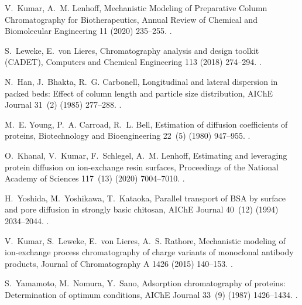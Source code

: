 \documentclass[preprint,review,12pt]{elsarticle}
\providecommand{\DIFaddtex}[1]{{\protect\color{blue} \sf #1}} %
\providecommand{\DIFaddbegin}{} %
\providecommand{\DIFaddend}{} %
\providecommand{\DIFadd}[1]{\texorpdfstring{\DIFaddtex{#1}}{#1}} %
\begin{document}
\begin{thebibliography}{10}
V.~Kumar, A.~M. Lenhoff, {Mechanistic Modeling of Preparative Column
  Chromatography for Biotherapeutics}, Annual Review of Chemical and
  Biomolecular Engineering 11 (2020) 235--255.
\newblock \href {https://doi.org/10.1146/annurev-chembioeng-102419-125430}
  {}.

S.~Leweke, E.~von Lieres, {Chromatography analysis and design toolkit (CADET)},
  Computers and Chemical Engineering 113 (2018) 274--294.
\newblock \href {https://doi.org/10.1016/j.compchemeng.2018.02.025}
  {}.

N.~Han, J.~Bhakta, R.~G. Carbonell, {Longitudinal and lateral dispersion in
  packed beds: Effect of column length and particle size distribution}, AIChE
  Journal 31~(2) (1985) 277--288.
\newblock \href {https://doi.org/10.1002/aic.690310215}
  {}.

M.~E. Young, P.~A. Carroad, R.~L. Bell, {Estimation of diffusion coefficients
  of proteins}, Biotechnology and Bioengineering 22~(5) (1980) 947--955.
\newblock \href {https://doi.org/10.1002/bit.260220504}
  {}.

O.~Khanal, V.~Kumar, F.~Schlegel, A.~M. Lenhoff, Estimating and leveraging
  protein diffusion on ion-exchange resin surfaces, Proceedings of the National
  Academy of Sciences 117~(13) (2020) 7004--7010.
\newblock \href {https://doi.org/10.1073/pnas.1921499117}
  {}.

H.~Yoshida, M.~Yoshikawa, T.~Kataoka, {Parallel transport of BSA by surface and
  pore diffusion in strongly basic chitosan}, AIChE Journal 40~(12) (1994)
  2034--2044.
\newblock \href {https://doi.org/10.1002/aic.690401213}
  {}.

V.~Kumar, S.~Leweke, E.~von Lieres, A.~S. Rathore, {Mechanistic modeling of
  ion-exchange process chromatography of charge variants of monoclonal antibody
  products}, Journal of Chromatography A 1426 (2015) 140--153.
\newblock \href {https://doi.org/10.1016/j.chroma.2015.11.062}
  {}.

S.~Yamamoto, M.~Nomura, Y.~Sano, {Adsorption chromatography of proteins:
  Determination of optimum conditions}, AIChE Journal 33~(9) (1987) 1426--1434.
\DIFaddbegin \newblock \href {https://doi.org/10.1002/aic.690330903}
  {}\DIFadd{.
}\DIFaddend 


\end{thebibliography}
\end{document}
